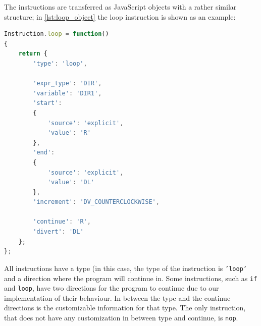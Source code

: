 The instructions are transferred as JavaScript objects with a rather similar structure; in \autoref{lst:loop_object} the loop instruction is shown as an example:

\begin{lstlisting}[language=javascript, caption=Loop Object, label=lst:loop_object]
Instruction.loop = function()
{
	return {
		'type': 'loop',

		'expr_type': 'DIR',
		'variable': 'DIR1',
		'start':
		{
			'source': 'explicit',
			'value': 'R'
		},
		'end':
		{
			'source': 'explicit',
			'value': 'DL'
		},
		'increment': 'DV_COUNTERCLOCKWISE',
		
		'continue': 'R',
		'divert': 'DL'
	};
};
\end{lstlisting}

All instructions have a type (in this case, the type of the instruction is \texttt{'loop'} and a direction where the program will continue in.
Some instructions, such as \texttt{if} and \texttt{loop}, have two directions for the program to continue due to our implementation of their behaviour.
In between the type and the continue directions is the customizable information for that type.
The only instruction, that does not have any customization in between type and continue, is \texttt{nop}.
